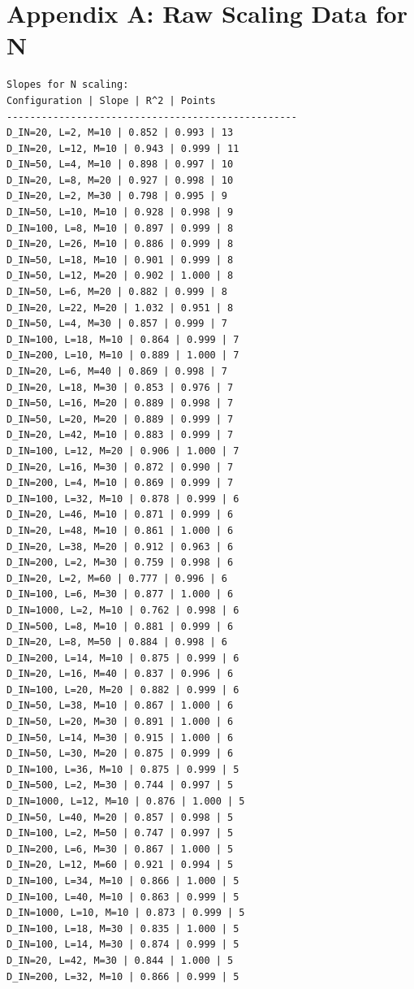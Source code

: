 \documentclass{article}
\begin{document}
\newpage
\appendix
\section*{Appendix A: Raw Scaling Data for N}

\begin{verbatim}
Slopes for N scaling:
Configuration | Slope | R^2 | Points
--------------------------------------------------
D_IN=20, L=2, M=10 | 0.852 | 0.993 | 13
D_IN=20, L=12, M=10 | 0.943 | 0.999 | 11
D_IN=50, L=4, M=10 | 0.898 | 0.997 | 10
D_IN=20, L=8, M=20 | 0.927 | 0.998 | 10
D_IN=20, L=2, M=30 | 0.798 | 0.995 | 9
D_IN=50, L=10, M=10 | 0.928 | 0.998 | 9
D_IN=100, L=8, M=10 | 0.897 | 0.999 | 8
D_IN=20, L=26, M=10 | 0.886 | 0.999 | 8
D_IN=50, L=18, M=10 | 0.901 | 0.999 | 8
D_IN=50, L=12, M=20 | 0.902 | 1.000 | 8
D_IN=50, L=6, M=20 | 0.882 | 0.999 | 8
D_IN=20, L=22, M=20 | 1.032 | 0.951 | 8
D_IN=50, L=4, M=30 | 0.857 | 0.999 | 7
D_IN=100, L=18, M=10 | 0.864 | 0.999 | 7
D_IN=200, L=10, M=10 | 0.889 | 1.000 | 7
D_IN=20, L=6, M=40 | 0.869 | 0.998 | 7
D_IN=20, L=18, M=30 | 0.853 | 0.976 | 7
D_IN=50, L=16, M=20 | 0.889 | 0.998 | 7
D_IN=50, L=20, M=20 | 0.889 | 0.999 | 7
D_IN=20, L=42, M=10 | 0.883 | 0.999 | 7
D_IN=100, L=12, M=20 | 0.906 | 1.000 | 7
D_IN=20, L=16, M=30 | 0.872 | 0.990 | 7
D_IN=200, L=4, M=10 | 0.869 | 0.999 | 7
D_IN=100, L=32, M=10 | 0.878 | 0.999 | 6
D_IN=20, L=46, M=10 | 0.871 | 0.999 | 6
D_IN=20, L=48, M=10 | 0.861 | 1.000 | 6
D_IN=20, L=38, M=20 | 0.912 | 0.963 | 6
D_IN=200, L=2, M=30 | 0.759 | 0.998 | 6
D_IN=20, L=2, M=60 | 0.777 | 0.996 | 6
D_IN=100, L=6, M=30 | 0.877 | 1.000 | 6
D_IN=1000, L=2, M=10 | 0.762 | 0.998 | 6
D_IN=500, L=8, M=10 | 0.881 | 0.999 | 6
D_IN=20, L=8, M=50 | 0.884 | 0.998 | 6
D_IN=200, L=14, M=10 | 0.875 | 0.999 | 6
D_IN=20, L=16, M=40 | 0.837 | 0.996 | 6
D_IN=100, L=20, M=20 | 0.882 | 0.999 | 6
D_IN=50, L=38, M=10 | 0.867 | 1.000 | 6
D_IN=50, L=20, M=30 | 0.891 | 1.000 | 6
D_IN=50, L=14, M=30 | 0.915 | 1.000 | 6
D_IN=50, L=30, M=20 | 0.875 | 0.999 | 6
D_IN=100, L=36, M=10 | 0.875 | 0.999 | 5
D_IN=500, L=2, M=30 | 0.744 | 0.997 | 5
D_IN=1000, L=12, M=10 | 0.876 | 1.000 | 5
D_IN=50, L=40, M=20 | 0.857 | 0.998 | 5
D_IN=100, L=2, M=50 | 0.747 | 0.997 | 5
D_IN=200, L=6, M=30 | 0.867 | 1.000 | 5
D_IN=20, L=12, M=60 | 0.921 | 0.994 | 5
D_IN=100, L=34, M=10 | 0.866 | 1.000 | 5
D_IN=100, L=40, M=10 | 0.863 | 0.999 | 5
D_IN=1000, L=10, M=10 | 0.873 | 0.999 | 5
D_IN=100, L=18, M=30 | 0.835 | 1.000 | 5
D_IN=100, L=14, M=30 | 0.874 | 0.999 | 5
D_IN=20, L=42, M=30 | 0.844 | 1.000 | 5
D_IN=200, L=32, M=10 | 0.866 | 0.999 | 5

\end{verbatim}
\end{document}
